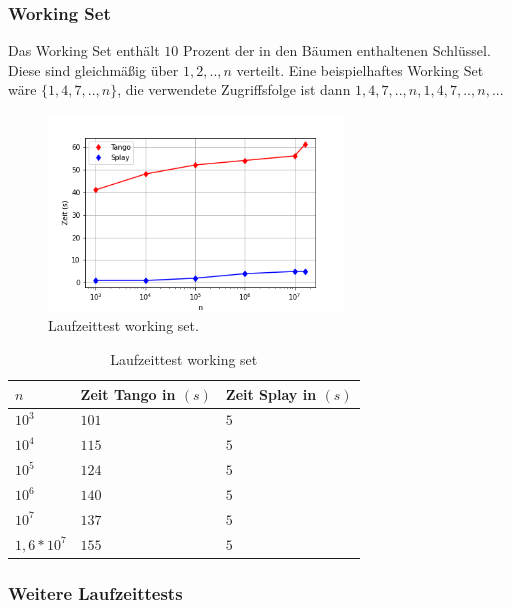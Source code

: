 \documentclass[a4paper,12pt]{article}
\begin{document}
\subsubsection{Working Set}
Das Working Set enthält $10$ Prozent der in den Bäumen enthaltenen Schlüssel. Diese sind gleichmäßig über $1, 2, .., n$ verteilt. Eine beispielhaftes Working Set wäre $\{1, 4, 7,.., n\}$, die verwendete Zugriffsfolge ist dann  $1, 4, 7,..,n, 1, 4, 7, .., n,...$  
 \begin{figure}[H]
	\centering
	\includegraphics[width=0.7\textwidth]{"Medien/laufzeittest/diagramm/workingset"}
	\caption{Laufzeittest working set.}
\end{figure}
\begin{table}[H]
	\begin{center}
		\begin{tabular}[c]{|l|l|l|}
			\hline
			$n$ & Zeit Tango in $\left(s\right)$ &Zeit Splay in $\left(s\right)$ \\
			\hline
			$10^3$ & $101$ &$5$ \\
			\hline
			$10^4$  & $115$ &$5$  \\
			\hline
			$10^5$  & $124$ &$5$  \\
			\hline
			$10^6$  & $140$ &$5$  \\
			\hline
			$10^7$  & $137$ &$5$  \\
			\hline
			$1,6 *10^7$  & $155$ &$5$  \\
			\hline
		\end{tabular}
		\caption{Laufzeittest working set} 
	\end{center}
\end{table}

\subsubsection{Weitere Laufzeittests}
\end{document}
